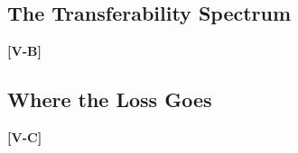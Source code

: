 \documentclass[letterpaper, 10 pt, conference]{ieeeconf}
\newcommand{\todo}[1]{\textbf{[#1]}}
\begin{document}
\subsection{The Transferability Spectrum}
\label{sec:results:spectrum}
\todo{V-B}

\subsection{Where the Loss Goes}
\label{sec:results:attribution}
\todo{V-C}
\end{document}
